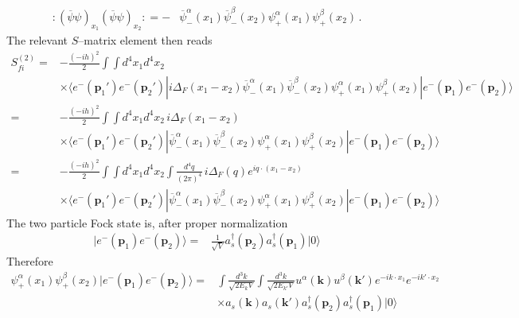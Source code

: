 \begin{align}
:(\overline{\psi}\psi)_{x_1}(\overline{\psi}\psi)_{x_2}:  
=-&\overline{\psi}^\alpha_-(x_1)\overline{\psi}^\beta_-(x_2)\psi^\alpha_+(x_1)\psi^\beta_+(x_2)\,.
\end{align}
The relevant $S$--matrix element then reads
\begin{align}
  S^{(2)}_{fi}=&-\frac{(-ih)^2}{2}\int\int d^4x_1 d^4x_2\nonumber\\
&\times\langle e^-(\mathbf{p}_1')e^-(\mathbf{p}_2')|
i\Delta_F(x_1-x_2)\overline{\psi}^\alpha_-(x_1)\overline{\psi}^\beta_-(x_2)\psi^\alpha_+(x_1)\psi^\beta_+(x_2)|e^-(\mathbf{p}_1)e^-(\mathbf{p}_2)\rangle\nonumber\\
=&-\frac{(-ih)^2}{2}\int\int d^4x_1 d^4x_2\,i\Delta_F(x_1-x_2)\nonumber\\
&\times\langle e^-(\mathbf{p}_1')e^-(\mathbf{p}_2')|
\overline{\psi}^\alpha_-(x_1)\overline{\psi}^\beta_-(x_2)\psi^\alpha_+(x_1)\psi^\beta_+(x_2)|e^-(\mathbf{p}_1)e^-(\mathbf{p}_2)\rangle\nonumber\\
=&-\frac{(-ih)^2}{2}\int\int d^4x_1 d^4x_2\int\frac{d^4q}{(2\pi)^4}\,i\Delta_F(q)e^{i q\cdot(x_1-x_2)}\nonumber\\
&\times\langle e^-(\mathbf{p}_1')e^-(\mathbf{p}_2')|
\overline{\psi}^\alpha_-(x_1)\overline{\psi}^\beta_-(x_2)\psi^\alpha_+(x_1)\psi^\beta_+(x_2)|e^-(\mathbf{p}_1)e^-(\mathbf{p}_2)\rangle
\end{align}
The two particle Fock state is, after proper normalization
\begin{align}
  |e^-(\mathbf{p}_1)e^-(\mathbf{p}_2)\rangle=&\frac{1}{\sqrt{V}}a_s^\dagger(\mathbf{p}_2)a_s^\dagger(\mathbf{p}_1)|0\rangle
\end{align}
Therefore
\begin{align}
  \psi^\alpha_+(x_1)\psi^\beta_+(x_2)|e^-(\mathbf{p}_1)e^-(\mathbf{p}_2)\rangle=&
\int\frac{d^3k}{\sqrt{2E_k V}}\int\frac{d^3k}{\sqrt{2E_{k'}V}}
u^\alpha(\mathbf{k})u^\beta(\mathbf{k}')e^{-i k\cdot x_1}e^{-i k'\cdot x_2}\nonumber\\
&\times a_s(\mathbf{k})a_s(\mathbf{k}')a_s^\dagger(\mathbf{p}_2)a_s^\dagger(\mathbf{p}_1)|0\rangle
\end{align}


